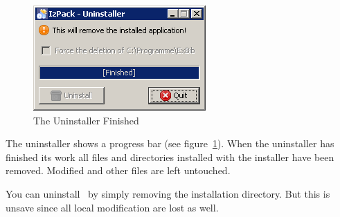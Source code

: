 \begin{figure}[!h]
  \centering
  \includegraphics[width=.45\textwidth]{img/uninst2}
  \caption{The Uninstaller Finished}
  \label{fig:uninst2}
\end{figure}

The uninstaller shows a progress bar (see figure~\ref{fig:uninst2}).
When the uninstaller has finished its work all files and directories
installed with the installer have been removed. Modified and other
files are left untouched.

You can uninstall \ExBib\ by simply removing the installation
directory. But this is unsave since all local modification are lost as
well.



\endinput
%
